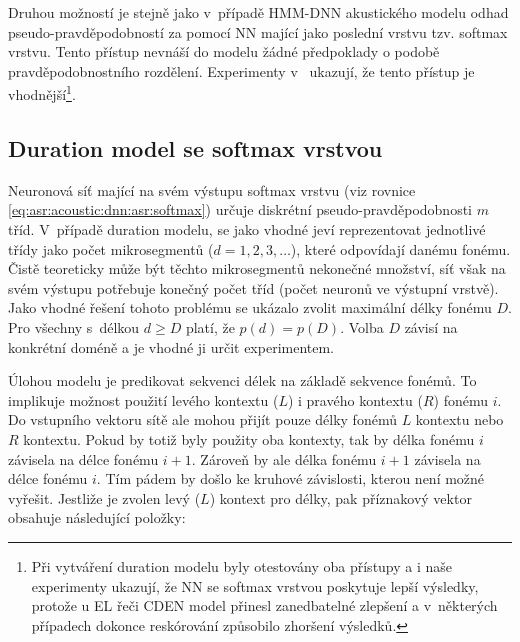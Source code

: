 Druhou možností je stejně jako v~případě HMM-DNN akustického modelu odhad pseudo-pravděpodobností za pomocí NN mající jako poslední vrstvu tzv. softmax vrstvu. Tento přístup nevnáší do modelu žádné předpoklady o podobě pravděpodobnostního rozdělení. Experimenty v~\cite{Hadian2017} ukazují, že tento přístup je vhodnější\footnote{Při vytváření duration modelu byly otestovány oba přístupy a i naše experimenty ukazují, že NN se softmax vrstvou poskytuje lepší výsledky, protože u EL řeči CDEN model přinesl zanedbatelné zlepšení a v~některých případech dokonce reskórování způsobilo zhoršení výsledků.}.

\subsection{Duration model se softmax vrstvou}
\label{chap:realisation:durationmodels:nn:softmax}

Neuronová síť mající na svém výstupu softmax vrstvu (viz rovnice \ref{eq:asr:acoustic:dnn:asr:softmax}) určuje diskrétní pseudo-pravděpodobnosti $m$ tříd. V~případě duration modelu, se jako vhodné jeví reprezentovat jednotlivé třídy jako počet mikrosegmentů ($d=1,2,3,\dots$), které odpovídají danému fonému. Čistě teoreticky může být těchto mikrosegmentů nekonečné množství, síť však na svém výstupu potřebuje konečný počet tříd (počet neuronů ve výstupní vrstvě). Jako vhodné řešení tohoto problému se ukázalo zvolit maximální délky fonému $D$. Pro všechny s~délkou $d \geq D$ platí, že $p\left(d\right) = p\left(D\right)$. \cite{Hadian2017} Volba $D$ závisí na konkrétní doméně a je vhodné ji určit experimentem.

Úlohou modelu je predikovat sekvenci délek na základě sekvence fonémů. To implikuje možnost použití levého kontextu ($L$) i pravého kontextu ($R$) fonému $i$. Do vstupního vektoru sítě ale mohou přijít pouze délky fonémů $L$ kontextu  nebo $R$ kontextu. Pokud by totiž byly použity oba kontexty, tak by délka fonému $i$ závisela na délce fonému $i+1$. Zároveň by ale délka fonému $i+1$ závisela na délce fonému $i$. Tím pádem by došlo ke kruhové závislosti, kterou není možné vyřešit. Jestliže je zvolen levý ($L$) kontext pro délky, pak příznakový vektor obsahuje následující položky:

